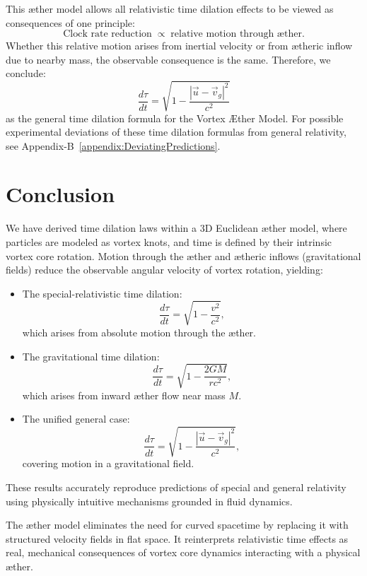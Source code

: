 \documentclass[a4paper,12pt]{article}
\begin{document}
This æther model allows all relativistic time dilation effects to be viewed as consequences of one principle:
\[
\text{Clock rate reduction} \;\propto\; \text{relative motion through æther}.
\]
Whether this relative motion arises from inertial velocity or from ætheric inflow due to nearby mass, the observable consequence is the same. Therefore, we conclude:
\[
\boxed{\frac{d\tau}{dt} = \sqrt{1 - \frac{|\vec{u} - \vec{v}_g|^2}{c^2}}}
\]
as the general time dilation formula for the Vortex Æther Model.
For possible experimental deviations of these time dilation formulas from general relativity, see Appendix-B~\ref{appendix:DeviatingPredictions}.

\section{Conclusion}

We have derived time dilation laws within a 3D Euclidean æther model, where particles are modeled as vortex knots, and time is defined by their intrinsic vortex core rotation. Motion through the æther and ætheric inflows (gravitational fields) reduce the observable angular velocity of vortex rotation, yielding:

\begin{itemize}
    \item The special-relativistic time dilation:
    \[
    \frac{d\tau}{dt} = \sqrt{1 - \frac{v^2}{c^2}},
    \]
    which arises from absolute motion through the æther.
    
    \item The gravitational time dilation:
    \[
    \frac{d\tau}{dt} = \sqrt{1 - \frac{2GM}{rc^2}},
    \]
    which arises from inward æther flow near mass $M$.
    
    \item The unified general case:
    \[
    \frac{d\tau}{dt} = \sqrt{1 - \frac{|\vec{u} - \vec{v}_g|^2}{c^2}},
    \]
    covering motion in a gravitational field.
\end{itemize}

These results accurately reproduce predictions of special and general relativity using physically intuitive mechanisms grounded in fluid dynamics.

The æther model eliminates the need for curved spacetime by replacing it with structured velocity fields in flat space. It reinterprets relativistic time effects as real, mechanical consequences of vortex core dynamics interacting with a physical æther.
\end{document}
